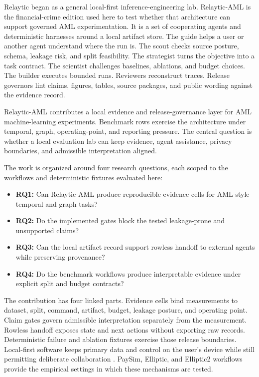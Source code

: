 \documentclass[11pt]{article}
\begin{document}
Relaytic began as a general local-first inference-engineering lab. Relaytic-AML is the financial-crime edition used here to test whether that architecture can support governed AML experimentation. It is a set of cooperating agents and deterministic harnesses around a local artifact store. The guide helps a user or another agent understand where the run is. The scout checks source posture, schema, leakage risk, and split feasibility. The strategist turns the objective into a task contract. The scientist challenges baselines, ablations, and budget choices. The builder executes bounded runs. Reviewers reconstruct traces. Release governors lint claims, figures, tables, source packages, and public wording against the evidence record.

Relaytic-AML contributes a local evidence and release-governance layer for AML machine-learning experiments. Benchmark rows exercise the architecture under temporal, graph, operating-point, and reporting pressure. The central question is whether a local evaluation lab can keep evidence, agent assistance, privacy boundaries, and admissible interpretation aligned.

The work is organized around four research questions, each scoped to the workflows and deterministic fixtures evaluated here:

\begin{itemize}
\item \textbf{RQ1:} Can Relaytic-AML produce reproducible evidence cells for AML-style temporal and graph tasks?
\item \textbf{RQ2:} Do the implemented gates block the tested leakage-prone and unsupported claims?
\item \textbf{RQ3:} Can the local artifact record support rowless handoff to external agents while preserving provenance?
\item \textbf{RQ4:} Do the benchmark workflows produce interpretable evidence under explicit split and budget contracts?
\end{itemize}


The contribution has four linked parts. Evidence cells bind measurements to dataset, split, command, artifact, budget, leakage posture, and operating point. Claim gates govern admissible interpretation separately from the measurement. Rowless handoff exposes state and next actions without exporting raw records. Deterministic failure and ablation fixtures exercise those release boundaries. Local-first software keeps primary data and control on the user's device while still permitting deliberate collaboration \citep{kleppmann2019localfirst}. PaySim, Elliptic, and Elliptic2 workflows provide the empirical settings in which these mechanisms are tested.
\end{document}
